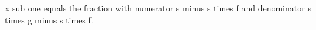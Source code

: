 x sub one equals the fraction with numerator s minus s times f and denominator s times g minus s times f.
